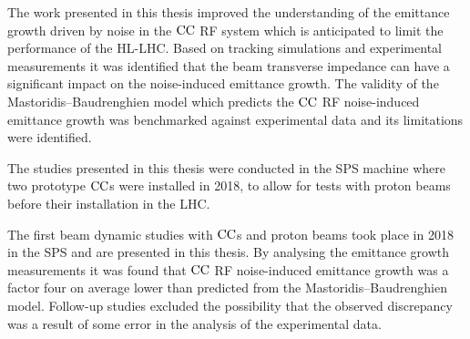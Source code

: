 
The work presented in this thesis improved the understanding of the emittance growth driven by noise in the ${\mathrm{CC}}$ RF system which is anticipated to limit the performance of the HL-LHC. Based on tracking simulations and experimental measurements it was identified that the beam transverse impedance can have a significant impact on the noise-induced emittance growth. The validity of the Mastoridis--Baudrenghien model which predicts the ${\mathrm{CC}}$ RF noise-induced emittance growth was benchmarked against experimental data and its limitations were identified.


The studies presented in this thesis were conducted in the SPS machine where two prototype ${\mathrm{CC}}$s were installed in 2018, to allow for tests with proton beams before their installation in the LHC.

The first beam dynamic studies with ${\mathrm{CC}}$s and proton beams took place in 2018 in the SPS and are presented in this thesis. By analysing the emittance growth measurements it was found that ${\mathrm{CC}}$ RF noise-induced emittance growth was a factor four on average lower than predicted from the Mastoridis--Baudrenghien model. Follow-up studies excluded the possibility that the observed discrepancy was a result of some error in the analysis of the experimental data.




